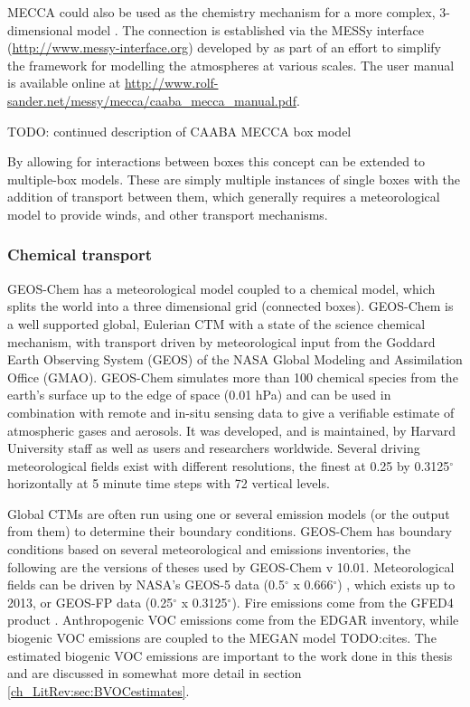       MECCA could also be used as the chemistry mechanism for a more complex, 3-dimensional model \citep[e.g.][]{Jockel2006}.
      The connection is established via the MESSy interface (\url{http://www.messy-interface.org}) developed by \cite{Jockel2005} as part of an effort to simplify the framework for modelling the atmospheres at various scales.
      The user manual is available online at \url{http://www.rolf-sander.net/messy/mecca/caaba_mecca_manual.pdf}.
  
      TODO: continued description of CAABA MECCA box model
    
      By allowing for interactions between boxes this concept can be extended to multiple-box models.
      These are simply multiple instances of single boxes with the addition of transport between them, which generally requires a meteorological model to provide winds, and other transport mechanisms.
      
    \subsubsection{Chemical transport} %
      GEOS-Chem has a meteorological model coupled to a chemical model, which splits the world into a three dimensional grid (connected boxes).
      GEOS-Chem is a well supported global, Eulerian CTM with a state of the science chemical mechanism, with transport driven by meteorological input from the Goddard Earth Observing System (GEOS) of the NASA Global Modeling and Assimilation Office (GMAO).
      GEOS-Chem simulates more than 100 chemical species from the earth's surface up to the edge of space (0.01 hPa) and can be used in combination with remote and in-situ sensing data to give a verifiable estimate of atmospheric gases and aerosols.
      It was developed, and is maintained, by Harvard University staff as well as users and researchers worldwide. 
      Several driving meteorological fields exist with different resolutions, the finest at 0.25 by 0.3125$^\circ$ horizontally at 5 minute time steps with 72 vertical levels.
      
      Global CTMs are often run using one or several emission models (or the output from them) to determine their boundary conditions.
      GEOS-Chem has boundary conditions based on several meteorological and emissions inventories, the following are the versions of theses used by GEOS-Chem v 10.01. 
      Meteorological fields can be driven by NASA's GEOS-5 data (0.5$^{\circ}$ x 0.666$^{\circ}$) \citep{Chen2009}, which exists up to 2013, or GEOS-FP data (0.25$^{\circ}$ x 0.3125$^{\circ}$).
      Fire emissions come from the GFED4 product \citep{Giglio2013}. 
      Anthropogenic VOC emissions come from the EDGAR inventory, while biogenic VOC emissions are coupled to the MEGAN model TODO:cites.
      The estimated biogenic VOC emissions are important to the work done in this thesis and are discussed in somewhat more detail in section \ref{ch_LitRev:sec:BVOCestimates}.
      
